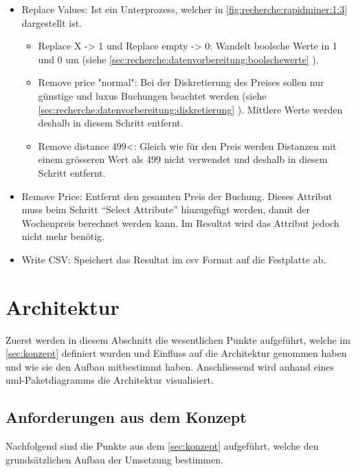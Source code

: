 \begin{itemize}
\begin{itemize}
	 	\end{itemize}
 	\item Replace Values: Ist ein Unterprozess, welcher in \cref{fig:recherche:rapidminer:1:3} dargestellt ist.
 		\begin{itemize}
			\item Replace X -> 1 und Replace empty -> 0: Wandelt boolsche Werte in 1 und 0 um (siehe \cref{sec:recherche:datenvorbereitung:boolschewerte} ). 
			\item Remove price "normal": Bei der Diskretierung des Preises sollen nur günstige und luxus Buchungen beachtet werden (siehe \cref{sec:recherche:datenvorbereitung:diskretierung} ). Mittlere Werte werden deshalb in diesem Schritt entfernt.
			\item Remove distance 499<: Gleich wie für den Preis werden Distanzen mit einem grösseren Wert als 499 nicht verwendet und deshalb in diesem Schritt entfernt.
 		\end{itemize}
 	\item Remove Price: Entfernt den gesamten Preis der Buchung. Dieses Attribut muss beim Schritt "`Select Attribute"' hinzugefügt werden, damit der Wochenpreis berechnet werden kann. Im Resultat wird das Attribut jedoch nicht mehr benötig.
 	\item Write CSV: Speichert das Resultat im \gls{csv} Format auf die Festplatte ab.
 \end{itemize}

\section{Architektur}
\label{sec:proofofconcept:architektur}
Zuerst werden in diesem Abschnitt die wesentlichen Punkte aufgeführt, welche im \cref{sec:konzept} definiert wurden und Einfluss auf die Architektur genommen haben und wie sie den Aufbau mitbestimmt haben. 
Anschliessend wird anhand eines \gls{uml}-Paketdiagramms die Architektur visualisiert.

\subsection{Anforderungen aus dem Konzept}
\label{sec:proofofconcept:architektur:anforderungen}
Nachfolgend sind die Punkte aus dem \cref{sec:konzept} aufgeführt, welche den grundsätzlichen Aufbau der Umsetzung bestimmen.

